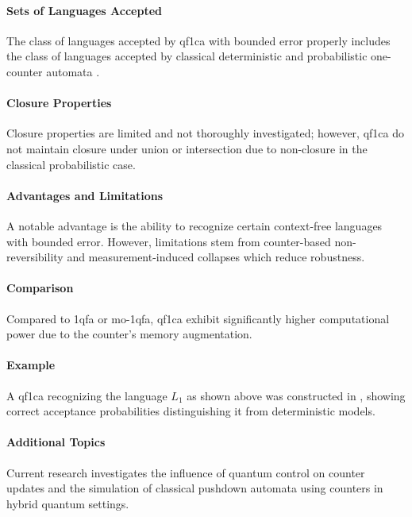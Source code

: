 \paragraph{Sets of Languages Accepted}
The class of languages accepted by \gls{qf1ca} with bounded error properly includes the class of languages accepted by classical deterministic and probabilistic one-counter automata \cite{bonner2001quantum}.

\paragraph{Closure Properties} 
Closure properties are limited and not thoroughly investigated; however, \gls{qf1ca} do not maintain closure under union or intersection due to non-closure in the classical probabilistic case.

\paragraph{Advantages and Limitations} 
A notable advantage is the ability to recognize certain context-free languages with bounded error. However, limitations stem from counter-based non-reversibility and measurement-induced collapses which reduce robustness.

\paragraph{Comparison} 
Compared to \gls{1qfa} or \gls{mo-1qfa}, \gls{qf1ca} exhibit significantly higher computational power due to the counter's memory augmentation.

\paragraph{Example} 
A \gls{qf1ca} recognizing the language $L_1$ as shown above was constructed in \cite{bonner2001quantum}, showing correct acceptance probabilities distinguishing it from deterministic models.

\paragraph{Additional Topics} 
Current research investigates the influence of quantum control on counter updates and the simulation of classical pushdown automata using counters in hybrid quantum settings.

\subsubsection{}

